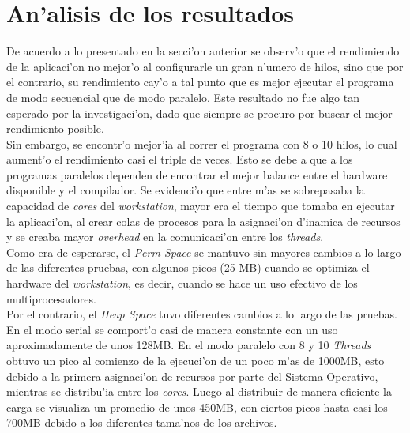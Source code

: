 \begin{table}[H]
\begin{center}
\end{center}
\caption{Resultados \emph{clustering} instancias agrupado por d'ias}
\end{table}

\section{An'alisis de los resultados}
\noindent
De acuerdo a lo presentado en la secci'on anterior se observ'o que el rendimiendo de la aplicaci'on no mejor'o al configurarle un gran n'umero de hilos, sino que por el contrario, su rendimiento cay'o a tal punto que es mejor ejecutar el programa de modo secuencial que de modo paralelo. Este resultado no fue algo tan esperado por la investigaci'on, dado que siempre se procuro por buscar el mejor rendimiento posible. \\

Sin embargo, se encontr'o mejor'ia al correr el programa con 8 o 10 hilos, lo cual aument'o el rendimiento casi el triple de veces. Esto se debe a que a los programas paralelos dependen de encontrar el mejor balance entre el hardware disponible y el compilador. Se evidenci'o que entre m'as se sobrepasaba la capacidad de \emph{cores} del \emph{workstation}, mayor era el tiempo que tomaba en ejecutar la aplicaci'on, al crear colas de procesos para la asignaci'on d'inamica de recursos y se creaba mayor \emph{overhead} en la comunicaci'on entre los \emph{threads}. \\

Como era de esperarse, el \emph{Perm Space} se mantuvo sin mayores cambios a lo largo de las diferentes pruebas, con algunos picos (25 MB) cuando se optimiza el hardware del \emph{workstation}, es decir, cuando se hace un uso efectivo de los multiprocesadores.\\

Por el contrario, el \emph{Heap Space} tuvo diferentes cambios a lo largo de las pruebas. En el modo serial se comport'o casi de manera constante con un uso aproximadamente de unos 128MB. En el modo paralelo con 8 y 10 \emph{Threads} obtuvo un pico al comienzo de la ejecuci'on de un poco m'as de 1000MB, esto debido a la primera asignaci'on de recursos por parte del Sistema Operativo, mientras se distribu'ia entre los \emph{cores}. Luego al distribuir de manera eficiente la carga se visualiza un promedio de unos 450MB, con ciertos picos hasta casi los 700MB debido a los diferentes tama'nos de los archivos.\\

